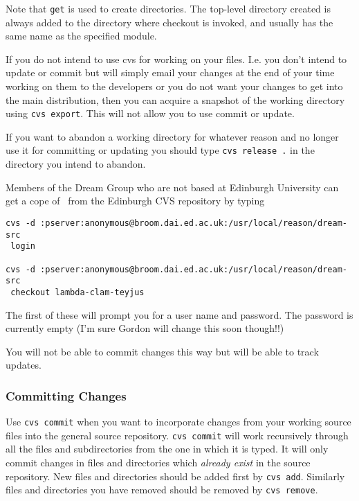 Note that {\tt get} is used to create directories.   The
          top-level  directory  created  is  always  added to the
          directory where checkout is invoked,  and  usually  has
          the  same name as the specified module.  

If you do not intend to use cvs for working on your files.
      I.e. you don't intend to update or commit but will simply email
      your changes at the end of your time working on them to the
      developers or you do not want your changes to get into the main
      distribution, then you can acquire a snapshot of the working
      directory using {\tt cvs export}.  This will not allow
      you to use commit or update.

If you want to 
      abandon a working directory for whatever
      reason and no longer use it for committing or updating you should 
      type {\tt cvs release .} in the directory you intend to abandon.

Members of the Dream Group who are not based at
  Edinburgh University can
get a cope of \lclam\ from the Edinburgh CVS repository by typing

\begin{verbatim}
cvs -d :pserver:anonymous@broom.dai.ed.ac.uk:/usr/local/reason/dream-src 
 login

cvs -d :pserver:anonymous@broom.dai.ed.ac.uk:/usr/local/reason/dream-src 
 checkout lambda-clam-teyjus
\end{verbatim}

The first of these will prompt you for a user name and password.  The
password is currently empty (I'm sure Gordon will change this soon
though!!)

You will not be able to commit changes this way but will be able to
track updates.


\subsubsection{Committing Changes}
Use {\tt cvs commit} when you want to     incorporate  changes
          from  your working source files into the general source
          repository.  {\tt cvs commit} will work recursively
    through all the files and subdirectories from the one in which it
    is typed.  It will only commit changes in files and directories
    which {\em already exist} in the source repository.  New files
    and directories should be added first by {\tt cvs add}.
    Similarly files and directories you have removed should be removed 
    by {\tt cvs remove}.

